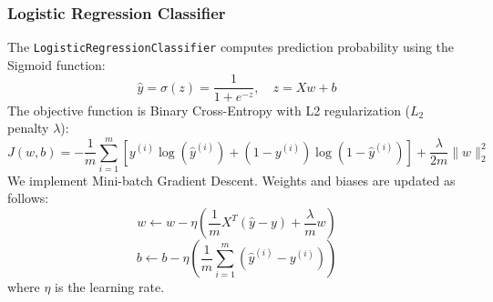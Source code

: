 \documentclass[conference]{IEEEtran}
\begin{document}
\subsubsection{Logistic Regression Classifier}
The \texttt{LogisticRegressionClassifier} computes prediction probability using the Sigmoid function:
\begin{equation}
\hat{y} = \sigma(z) = \frac{1}{1 + e^{-z}}, \quad z = Xw + b
\end{equation}
The objective function is Binary Cross-Entropy with L2 regularization ($L_2$ penalty $\lambda$):
\begin{equation}
J(w, b) = -\frac{1}{m} \sum_{i=1}^m \left[ y^{(i)} \log(\hat{y}^{(i)}) + (1 - y^{(i)}) \log(1 - \hat{y}^{(i)}) \right] + \frac{\lambda}{2m} \|w\|_2^2
\end{equation}
We implement Mini-batch Gradient Descent. Weights and biases are updated as follows:
\begin{equation}
w \leftarrow w - \eta \left( \frac{1}{m} X^T (\hat{y} - y) + \frac{\lambda}{m} w \right)
\end{equation}
\begin{equation}
b \leftarrow b - \eta \left( \frac{1}{m} \sum_{i=1}^m (\hat{y}^{(i)} - y^{(i)}) \right)
\end{equation}
where $\eta$ is the learning rate.
\end{document}
